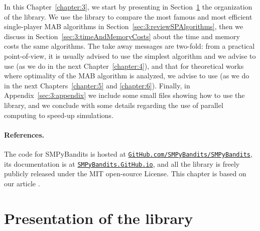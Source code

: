 In this Chapter~\ref{chapter:3}, we start by presenting in Section~\ref{sec:3:presentationLibrary} the organization of the library.
We use the library to compare the most famous and most efficient single-player MAB algorithms in Section~\ref{sec:3:reviewSPAlgorithms},
then we discuss in Section~\ref{sec:3:timeAndMemoryCosts} about the time and memory costs the same algorithms.
The take away messages are two-fold:
from a practical point-of-view, it is usually advised to use the simplest algorithm and we advise to use \UCB{} (as we do in the next Chapter~\ref{chapter:4}),
and that for theoretical works where optimality of the MAB algorithm is analyzed, we advise to use \klUCB{} (as we do in the next Chapters~\ref{chapter:5} and \ref{chapter:6}).
%
Finally, in Appendix~\ref{sec:3:appendix} we include some small files showing how to use the library, and we conclude with some details regarding the use of parallel computing to speed-up simulations.


\paragraph{References.}
%
The code for SMPyBandits is hosted at \texttt{\href{https://GitHub.com/SMPyBandits/SMPyBandits/}{GitHub.com/SMPyBandits/SMPyBandits}}, its documentation is at \texttt{\href{https://SMPyBandits.GitHub.io/}{SMPyBandits.GitHub.io}}, and all the library is freely publicly released under the MIT open-source License.
This chapter is based on our article \cite{SMPyBanditsJMLR}.


\section{Presentation of the library}
\label{sec:3:presentationLibrary}


